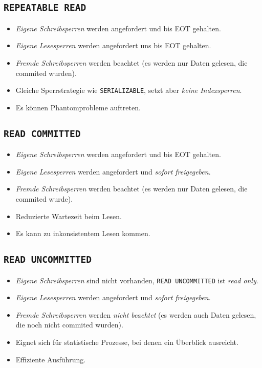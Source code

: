 \documentclass[a4paper, 11pt, accentcolor = tud3b]{tudreport}
\begin{document}
            \subsection{\lstinline|REPEATABLE READ|} %
                \begin{itemize}
                	\item \textit{Eigene Schreibsperren} werden angefordert und bis EOT gehalten.
                	\item \textit{Eigene Lesesperren} werden angefordert uns bis EOT gehalten.
                	\item \textit{Fremde Schreibsperren} werden beachtet (es werden nur Daten gelesen, die commited wurden).
                	\item Gleiche Sperrstrategie wie \lstinline|SERIALIZABLE|, setzt aber \textit{keine Indexsperren}.
                	\item Es können Phantomprobleme auftreten.
                \end{itemize}

            \subsection{\lstinline|READ COMMITTED|} %
                \begin{itemize}
                	\item \textit{Eigene Schreibsperren} werden angefordert und bis EOT gehalten.
                	\item \textit{Eigene Lesesperren} werden angefordert und \textit{sofort freigegeben}.
                	\item \textit{Fremde Schreibsperren} werden beachtet (es werden nur Daten gelesen, die commited wurde).
                	\item Reduzierte Wartezeit beim Lesen.
                	\item Es kann zu inkonsistentem Lesen kommen.
                \end{itemize}

            \subsection{\lstinline|READ UNCOMMITTED|} %
                \begin{itemize}
                	\item \textit{Eigene Schreibsperren} sind nicht vorhanden, \lstinline|READ UNCOMMITTED| ist \textit{read only}.
                	\item \textit{Eigene Lesesperren} werden angefordert und \textit{sofort freigegeben}.
                	\item \textit{Fremde Schreibsperren} werden \textit{nicht beachtet} (es werden auch Daten gelesen, die noch nicht commited wurden).
                	\item Eignet sich für statistische Prozesse, bei denen ein Überblick ausreicht.
                	\item Effiziente Ausführung.
                \end{itemize}
            
\end{document}
